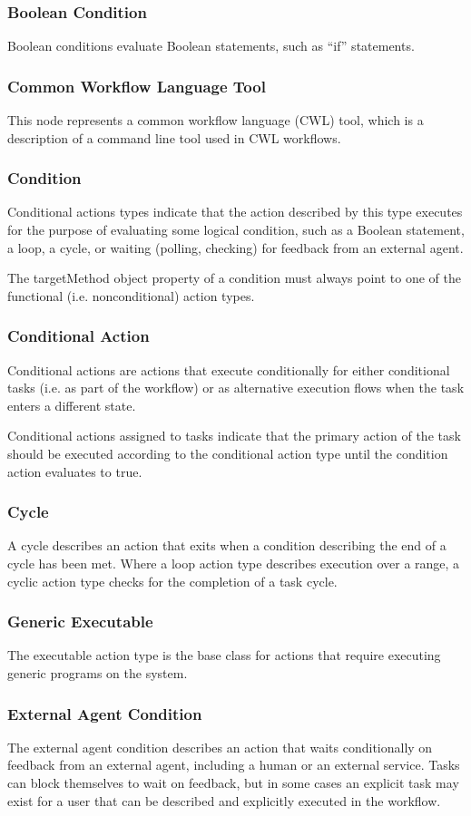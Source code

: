 \subsubsection{ Boolean Condition } Boolean conditions evaluate Boolean
statements, such as ``if'' statements.
\subsubsection{ Common Workflow Language Tool } This node represents a common
workflow language (CWL) tool, which is a description of a command line tool used
in CWL workflows.
\subsubsection{ Condition } Conditional actions types indicate that the action
described by this type executes for the purpose of evaluating some logical
condition, such as a Boolean statement, a loop, a cycle, or waiting (polling,
checking) for feedback from an external agent.
			
The targetMethod object property of a condition must always point to one of the
functional (i.e. nonconditional) action types.
\subsubsection{ Conditional Action } Conditional actions are actions that
execute conditionally for either conditional tasks (i.e. as part of the
workflow) or as alternative execution flows when the task enters a different
state.

Conditional actions assigned to tasks indicate that the primary action of the
task should be executed according to the conditional action type until the
condition action evaluates to true.
\subsubsection{ Cycle } A cycle describes an action that exits when a condition
describing the end of a cycle has been met. Where a loop action type describes
execution over a range, a cyclic action type checks for the completion of a task
cycle.
\subsubsection{ Generic Executable } The executable action type is the base
class for actions that require executing generic programs on the system.
\subsubsection{ External Agent Condition } The external agent condition
describes an action that waits conditionally on feedback from an external agent,
including a human or an external service. Tasks can block themselves to wait on
feedback, but in some cases an explicit task may exist for a user that can
be described and explicitly executed in the workflow.
